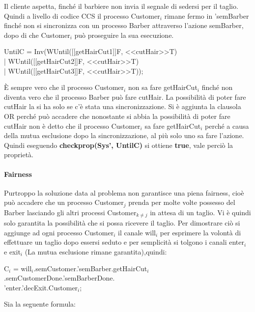 Il cliente aspetta, finché il barbiere non invia il segnale di sedersi per il taglio. Quindi a livello di codice CCS il processo \textsf{Customer$_{i}$} rimane fermo in \textsf{'semBarber} finché non si sincronizza con un processo \textsf{Barber} attraverso l'azione \textsf{semBarber}, dopo di che \textsf{Customer$_{i}$} può proseguire la sua esecuzione.
\begin{center}
	\textsf{UntilC = Inv(WUntil([[getHairCut1]]F, <<cutHair>>T) \\| WUntil([[getHairCut2]]F, <<cutHair>>T) \\| WUntil([[getHairCut3]]F, <<cutHair>>T));}
\end{center}

È sempre vero che il processo \textsf{Customer$_{i}$} non sa fare \textsf{getHairCut$_{i}$} finché non diventa vero che il processo \textsf{Barber} può fare \textsf{cutHair}. La possibilità di poter fare \textsf{cutHair} la si ha solo se c'è stata una sincronizzazione. Si è aggiunta la clausola OR perché può accadere che nonostante si abbia la possibilità di poter fare \textsf{cutHair} non è detto che il processo \textsf{Customer$_{i}$} sa fare \textsf{getHairCut$_{i}$} perché a causa della mutua esclusione dopo la sincronizzazione, al più solo uno sa fare l'azione. Quindi eseguendo \textbf{checkprop(Sys', UntilC)} si ottiene \textbf{true}, vale perciò la proprietà.

\paragraph{Fairness}\mbox{}

Purtroppo la soluzione data al problema non garantisce una piena fairness, cioè può accadere che un processo \textsf{Customer$_{j}$} prenda per molte volte possesso del \textsf{Barber} lasciando gli altri processi \textsf{Customer$_{k\not=j}$} in attesa di un taglio. Vi è quindi solo garantita la possibilità che si possa ricevere il taglio.
Per dimostrare ciò si aggiunge ad ogni processo \textsf{Customer$_{i}$} il canale \textsf{will$_{i}$} per esprimere la volontà di effettuare un taglio dopo essersi seduto e per semplicità si tolgono i canali \textsf{enter$_{i}$} e \textsf{exit$_{i}$} (La mutua esclusione rimane garantita),quindi:

\textsf{C$_{i}$ = will$_{i}$.semCustomer.'semBarber.getHairCut$_{i}$.semCustomerDone.'semBarberDone.}\\
\textsf{'enter.'decExit.Customer$_{i}$;}

Sia la seguente formula:

